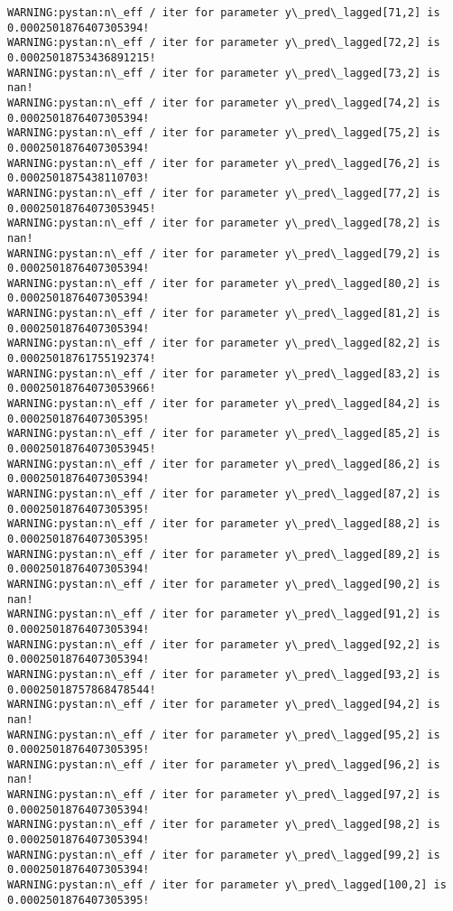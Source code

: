 \documentclass[11pt]{article}
\begin{document}
\begin{Verbatim}[commandchars=\\\{\}]
WARNING:pystan:n\_eff / iter for parameter y\_pred\_lagged[71,2] is 0.0002501876407305394!
WARNING:pystan:n\_eff / iter for parameter y\_pred\_lagged[72,2] is 0.00025018753436891215!
WARNING:pystan:n\_eff / iter for parameter y\_pred\_lagged[73,2] is nan!
WARNING:pystan:n\_eff / iter for parameter y\_pred\_lagged[74,2] is 0.0002501876407305394!
WARNING:pystan:n\_eff / iter for parameter y\_pred\_lagged[75,2] is 0.0002501876407305394!
WARNING:pystan:n\_eff / iter for parameter y\_pred\_lagged[76,2] is 0.0002501875438110703!
WARNING:pystan:n\_eff / iter for parameter y\_pred\_lagged[77,2] is 0.00025018764073053945!
WARNING:pystan:n\_eff / iter for parameter y\_pred\_lagged[78,2] is nan!
WARNING:pystan:n\_eff / iter for parameter y\_pred\_lagged[79,2] is 0.0002501876407305394!
WARNING:pystan:n\_eff / iter for parameter y\_pred\_lagged[80,2] is 0.0002501876407305394!
WARNING:pystan:n\_eff / iter for parameter y\_pred\_lagged[81,2] is 0.0002501876407305394!
WARNING:pystan:n\_eff / iter for parameter y\_pred\_lagged[82,2] is 0.00025018761755192374!
WARNING:pystan:n\_eff / iter for parameter y\_pred\_lagged[83,2] is 0.00025018764073053966!
WARNING:pystan:n\_eff / iter for parameter y\_pred\_lagged[84,2] is 0.0002501876407305395!
WARNING:pystan:n\_eff / iter for parameter y\_pred\_lagged[85,2] is 0.00025018764073053945!
WARNING:pystan:n\_eff / iter for parameter y\_pred\_lagged[86,2] is 0.0002501876407305394!
WARNING:pystan:n\_eff / iter for parameter y\_pred\_lagged[87,2] is 0.0002501876407305395!
WARNING:pystan:n\_eff / iter for parameter y\_pred\_lagged[88,2] is 0.0002501876407305395!
WARNING:pystan:n\_eff / iter for parameter y\_pred\_lagged[89,2] is 0.0002501876407305394!
WARNING:pystan:n\_eff / iter for parameter y\_pred\_lagged[90,2] is nan!
WARNING:pystan:n\_eff / iter for parameter y\_pred\_lagged[91,2] is 0.0002501876407305394!
WARNING:pystan:n\_eff / iter for parameter y\_pred\_lagged[92,2] is 0.0002501876407305394!
WARNING:pystan:n\_eff / iter for parameter y\_pred\_lagged[93,2] is 0.00025018757868478544!
WARNING:pystan:n\_eff / iter for parameter y\_pred\_lagged[94,2] is nan!
WARNING:pystan:n\_eff / iter for parameter y\_pred\_lagged[95,2] is 0.0002501876407305395!
WARNING:pystan:n\_eff / iter for parameter y\_pred\_lagged[96,2] is nan!
WARNING:pystan:n\_eff / iter for parameter y\_pred\_lagged[97,2] is 0.0002501876407305394!
WARNING:pystan:n\_eff / iter for parameter y\_pred\_lagged[98,2] is 0.0002501876407305394!
WARNING:pystan:n\_eff / iter for parameter y\_pred\_lagged[99,2] is 0.0002501876407305394!
WARNING:pystan:n\_eff / iter for parameter y\_pred\_lagged[100,2] is 0.0002501876407305395!

\end{Verbatim}
\end{document}
